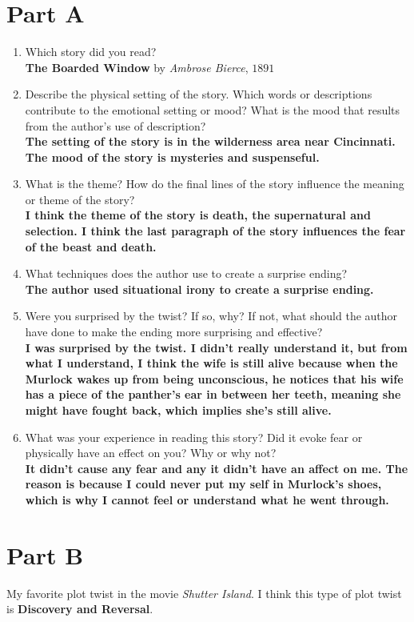 \section*{Part A}
\label{sec:part_a}

\begin{enumerate}
  \label{enum:questions}

  \item Which story did you read? \\
    \textbf{The Boarded Window} by \textit{Ambrose Bierce}, $1891$
  \item Describe the physical setting of the story. Which words or descriptions
    contribute to the emotional setting or mood? What is the mood that results
    from the author’s use of description? \\
      \textbf{The setting of the story is in the wilderness area near
        Cincinnati. The mood of the story is mysteries and suspenseful.}
  \item What is the theme? How do the final lines of the story influence the
    meaning or theme of the story? \\
      \textbf{I think the theme of the story is death, the supernatural and
        selection. I think the last paragraph of the story influences the fear of
        the beast and death.}
  \item What techniques does the author use to create a surprise ending? \\
      \textbf{The author used situational irony to create a surprise ending.}
  \item Were you surprised by the twist? If so, why? If not, what should the
    author have done to make the ending more surprising and effective? \\
      \textbf{I was surprised by the twist. I didn't really understand it, but
        from what I understand, I think the wife is still alive because when the
        Murlock wakes up from being unconscious, he notices that his wife has a
        piece of the panther's ear in between her teeth, meaning she might have fought
        back, which implies she's still alive.}
  \item What was your experience in reading this story? Did it evoke fear or
    physically have an effect on you? Why or why not? \\
      \textbf{It didn't cause any fear and any it didn't have an affect on me.
        The reason is because I could never put my self in Murlock's shoes,
        which is why I cannot feel or understand what he went through.}
\end{enumerate}


\newpage

\section*{Part B}
\label{sec:part_b}

My favorite plot twist in the movie \textit{Shutter Island}. I think this type
of plot twist is \textbf{Discovery and Reversal}.

